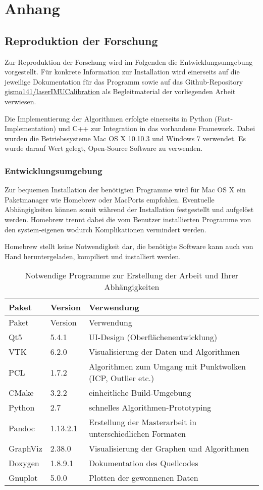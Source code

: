 \chapter{Anhang}\label{anhang}

\section{Reproduktion der Forschung}\label{reproduktion-der-forschung}

Zur Reproduktion der Forschung wird im Folgenden die
Entwicklungsumgebung vorgestellt. Für konkrete Information zur
Installation wird einerseits auf die jeweilige Dokumentation für das
Programm sowie auf das Github-Repository
\href{https://github.com/gismo141/laserIMUCalibration}{gismo141/laserIMUCalibration}
als Begleitmaterial der vorliegenden Arbeit verwiesen.

Die Implementierung der Algorithmen erfolgte einerseits in Python
(Fast-Implementation) und C++ zur Integration in das vorhandene
Framework. Dabei wurden die Betriebssysteme Mac OS X 10.10.3 und Windows
7 verwendet. Es wurde darauf Wert gelegt, Open-Source Software zu
verwenden.

\subsection{Entwicklungsumgebung}\label{entwicklungsumgebung}

Zur bequemen Installation der benötigten Programme wird für Mac OS X ein
Paketmanager wie Homebrew oder MacPorts empfohlen. Eventuelle
Abhängigkeiten können somit während der Installation festgestellt und
aufgelöst werden. Homebrew trennt dabei die vom Benutzer installierten
Programme von den system-eigenen wodurch Komplikationen vermindert
werden.

Homebrew stellt keine Notwendigkeit dar, die benötigte Software kann
auch von Hand heruntergeladen, kompiliert und installiert werden.

\begin{longtable}[c]{@{}lll@{}}
\caption{Notwendige Programme zur Erstellung der Arbeit und Ihrer
Abhängigkeiten}\tabularnewline
\toprule
Paket & Version & Verwendung\tabularnewline
\midrule
\endfirsthead
\toprule
Paket & Version & Verwendung\tabularnewline
\midrule
\endhead
Qt5 & 5.4.1 & UI-Design (Oberflächenentwicklung)\tabularnewline
VTK & 6.2.0 & Visualisierung der Daten und Algorithmen\tabularnewline
PCL & 1.7.2 & Algorithmen zum Umgang mit Punktwolken (ICP, Outlier
etc.)\tabularnewline
CMake & 3.2.2 & einheitliche Build-Umgebung\tabularnewline
Python & 2.7 & schnelles Algorithmen-Prototyping\tabularnewline
Pandoc & 1.13.2.1 & Erstellung der Masterarbeit in unterschiedlichen
Formaten\tabularnewline
GraphViz & 2.38.0 & Visualisierung der Graphen und
Algorithmen\tabularnewline
Doxygen & 1.8.9.1 & Dokumentation des Quellcodes\tabularnewline
Gnuplot & 5.0.0 & Plotten der gewonnenen Daten\tabularnewline
\bottomrule
\end{longtable}

